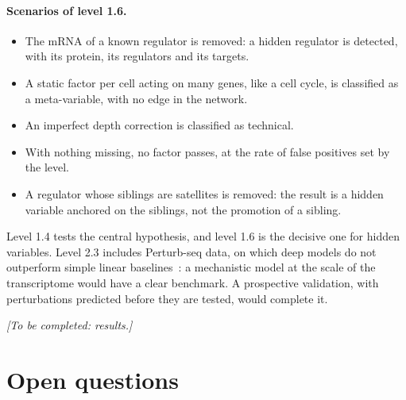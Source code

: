 \documentclass[a4paper, 11pt]{article}
\newcommand{\tofill}[1]{\par\smallskip\noindent\emph{[To be completed: #1]}\par\smallskip}
\theoremstyle{plain}
\theoremstyle{remark}
\begin{document}
\paragraph{Scenarios of level 1.6.}
\begin{itemize}[nosep]
\item The mRNA of a known regulator is removed: a hidden regulator is detected, with its protein, its regulators and its targets.
\item A static factor per cell acting on many genes, like a cell cycle, is classified as a meta-variable, with no edge in the network.
\item An imperfect depth correction is classified as technical.
\item With nothing missing, no factor passes, at the rate of false positives set by the level.
\item A regulator whose siblings are satellites is removed: the result is a hidden variable anchored on the siblings, not the promotion of a sibling.
\end{itemize}

Level 1.4 tests the central hypothesis, and level 1.6 is the decisive one for hidden variables. Level 2.3 includes Perturb-seq data, on which deep models do not outperform simple linear baselines~\cite{ahlmann2025deep}: a mechanistic model at the scale of the transcriptome would have a clear benchmark. A prospective validation, with perturbations predicted before they are tested, would complete it.

\tofill{results.}

\section{Open questions}\label{sec:open}
\end{document}
